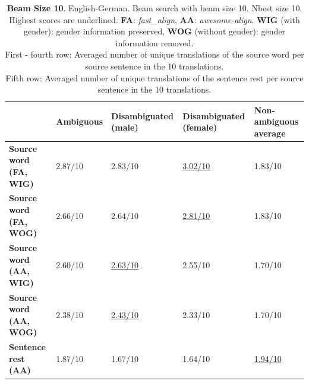 \begin{table}[!htb]

    \begin{subtable}{\textwidth}
        \centering
        \begin{tabularx}{\linewidth}{|X|XXXX|}
            \hline
             & \textbf{Ambiguous} & \textbf{Disambiguated (male)} & \textbf{Disambiguated (female)} & \textbf{Non-ambiguous average} \\ \hline
             \textbf{Source word (FA, WIG)} & 2.87/10 & 2.83/10 & \underline{3.02/10} & 1.83/10 \\
             \textbf{Source word (FA, WOG)} & 2.66/10 & 2.64/10 & \underline{2.81/10} & 1.83/10 \\
             \textbf{Source word (AA, WIG)} & 2.60/10 & \underline{2.63/10} & 2.55/10 & 1.70/10 \\ 
             \textbf{Source word (AA, WOG)} & 2.38/10 & \underline{2.43/10} & 2.33/10 & 1.70/10 \\\hline 
             \textbf{Sentence rest (AA)} & 1.87/10 & 1.67/10 & 1.64/10 & \underline{1.94/10} \\ \hline
        \end{tabularx}
        \caption{\textbf{Beam Size 10}. English-German. Beam search with beam size 10. Nbest size 10. Highest scores are underlined. \textbf{FA}: \textit{fast\_align}, \textbf{AA}: \textit{awesome-align}. \textbf{WIG} (with gender): gender information preserved, \textbf{WOG} (without gender): gender information removed. \\ First - fourth row: Averaged number of unique translations of the source word per source sentence in the 10 translations. \\ Fifth row: Averaged number of unique translations of the sentence rest per source sentence in the 10 translations.}
        \label{tab:alignment_translation_10}
    \end{subtable}


\end{table}
